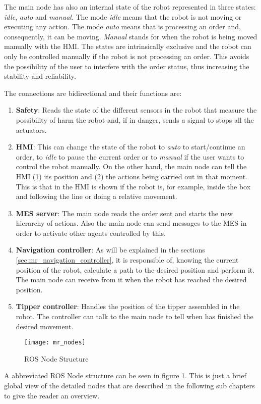 The main node has also an internal state of the robot represented in three states: \emph{idle}, \emph{auto} and \emph{manual}. 
The mode \emph{idle} means that the robot is not moving or executing any action. 
The mode \emph{auto} means that is processing an order and, consequently, it can be moving. \emph{Manual} stands for when the robot is being moved manually with the HMI. 
The states are intrinsically exclusive and the robot can only be controlled manually if the robot is not processing an order.
This avoids the possibility of the user to interfere with the order status, thus increasing the stability and reliability.

The connections are bidirectional and their functions are:
\begin{enumerate}
	\item \textbf{Safety}: Reads the state of the different sensors in the robot that measure the possibility of harm the robot and, if in danger, sends a signal to stops all the actuators.  
	\item \textbf{HMI}: This can change the state of the robot to \emph{auto} to start/continue an order, to \emph{idle} to pause the current order or to \emph{manual} if the user wants to control the robot manually. On the other hand, the main node can tell the HMI (1) its position and (2) the actions being carried out in that moment. This is that in the HMI is shown if the robot is, for example, inside the box and following the line or doing a relative movement.
	\item \textbf{MES server}: The main node reads the order sent and starts the new hierarchy of actions. Also the main node can send messages to the MES in order to activate other agents controlled by this.
	\item \textbf{Navigation controller}: As will be explained in the sections \ref{sec:mr_navigation_controller}, it is responsible of, knowing the current position of the robot, calculate a path to the desired position and perform it. The main node can receive from it when the robot has reached the desired position.
	\item \textbf{Tipper controller}: Handles the position of the tipper assembled in the robot. The controller can talk to the main node to tell when has finished the desired movement.
\end{enumerate}

\begin{figure}[H]
	\centering
	\texttt{[image: mr\_nodes]}
	\caption{ROS Node Structure}
	\label{fig:mr_ros_nodes}
\end{figure}
A abbreviated ROS Node structure can be seen in figure \ref{fig:mr_ros_nodes}. This is just a brief global view of the detailed nodes that are described in the following sub chapters to give the reader an overview.


